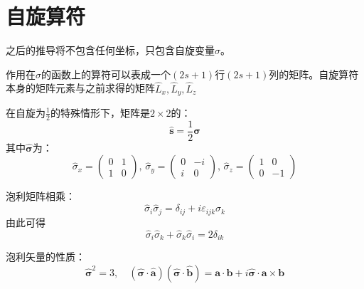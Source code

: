 \documentclass[12pt, a4paper, oneside]{ctexbook}
\newcommand{\hl}[1]{\hlbox{#1}}
\newcounter{#2}
\newcounter{#2}[#1]
\numberwithin{#2}{#1}
\begin{document}
            \section{自旋算符}
            之后的推导将不包含任何坐标，只包含自旋变量\(\sigma\)。
            \begin{define}
              作用在\(\sigma\)的函数上的算符可以表成一个\((2s+1)\)行\((2s+1)\)列的矩阵。自旋算符本身的矩阵元素与之前求得的矩阵\(\hat L_x,\hat L_y,\hat L_z\)

              在自旋为\(\frac12\)的特殊情形下，矩阵是\(2\times2\)的：
              \begin{equation}\label{eqn:spinOperator}
                \hat {\boldsymbol{s}}=\frac12\hat{\boldsymbol{\sigma}}
              \end{equation}\label{eqn:pauliMatrix}
              其中\(\hat{\boldsymbol{\sigma}}\)为\hl{泡利矩阵}：
              \begin{equation}
                \hat{\sigma}_x=\begin{pmatrix}
                  0&1\\1&0
                \end{pmatrix},\,\hat{\sigma}_y=\begin{pmatrix}
                  0&-i\\i&0
                \end{pmatrix},\,\hat\sigma_z=\begin{pmatrix}
                  1&0\\0&-1
                \end{pmatrix}
              \end{equation}
            \end{define}
            \begin{attr}
              泡利矩阵相乘：
              \begin{equation}\label{eqn:pauliMatrix-times}
                \hat\sigma_i\hat\sigma_j=\delta_{ij}+i\varepsilon_{ijk}\sigma_k
              \end{equation}
              由此可得\begin{equation}\label{eqn:pauliMatrix-anticommute}
                \hat\sigma_i\hat\sigma_k+\hat\sigma_k\hat\sigma_i=2\delta_{ik}
              \end{equation}
            \end{attr}
            \begin{attr}
              泡利矢量的性质：
              \begin{equation}\label{eqn:pauliVector-times}
                \hat{\boldsymbol{\sigma}}^2=3,\quad(\hat{\boldsymbol{\sigma}}\cdot\hat{\boldsymbol{a}})(\hat{\boldsymbol{\sigma}}\cdot\hat{\boldsymbol{b}})=\boldsymbol{a}\cdot\boldsymbol{b}+i\hat{\boldsymbol{\sigma}}\cdot\boldsymbol{a}\times\boldsymbol{b}
              \end{equation}
            \end{attr}
\end{document}
